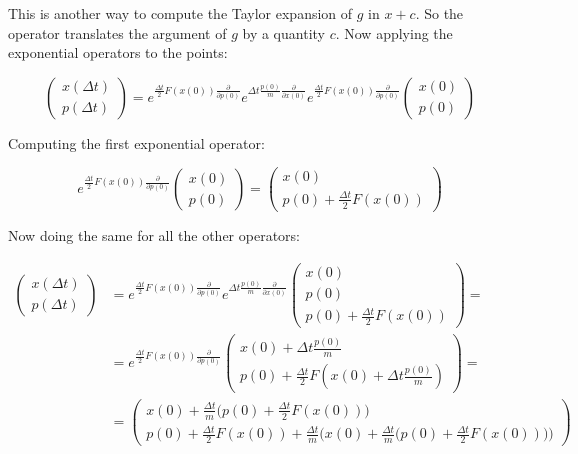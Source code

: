 	This is another way to compute the Taylor expansion of $g$ in $x+c$.
	So the operator translates the argument of $g$ by a quantity $c$.
	Now applying the exponential operators to the points:

	$$\begin{pmatrix}x(\Delta t)\\p(\Delta t)\end{pmatrix} = e^{\frac{\Delta t}{2}F(x(0))\frac{\partial}{\partial p(0)}}e^{\Delta t\frac{p(0)}{m}\frac{\partial}{\partial x(0)}}e^{\frac{\Delta t}{2}F(x(0))\frac{\partial}{\partial p(0)}}\begin{pmatrix}x(0)\\p(0)\end{pmatrix}$$

	Computing the first exponential operator:

	$$e^{\frac{\Delta t}{2}F(x(0))\frac{\partial}{\partial p(0)}}\begin{pmatrix}x(0)\\p(0)\end{pmatrix} = \begin{pmatrix}x(0)\\p(0) + \frac{\Delta t}{2}F(x(0))\end{pmatrix}$$

	Now doing the same for all the other operators:

	\begin{align*}
		\begin{pmatrix} x(\Delta t)\\ p(\Delta t)\end{pmatrix} &= e^{\frac{\Delta t}{2}F(x(0))\frac{\partial}{\partial p(0)}}e^{\Delta t\frac{p(0)}{m}\frac{\partial }{\partial x(0)}}\begin{pmatrix} x(0)\\p(0)\\p(0) + \frac{\Delta t}{2}F(x(0))\end{pmatrix} =\\
																													 & = e^{\frac{\Delta t}{2}F(x(0))\frac{\partial}{\partial p(0)}}\begin{pmatrix}x(0) + \Delta t\frac{p(0)}{m}\\p(0) + \frac{\Delta t}{2}F(x(0) + \Delta t\frac{p(0)}{m})\end{pmatrix} =\\
																													 &= \begin{pmatrix} x(0) + \frac{\Delta t}{m}\biggl(p(0) + \frac{\Delta t}{2}F(x(0))\biggr) \\ p(0) + \frac{\Delta t}{2}F(x(0)) + \frac{\Delta t}{m}\biggl(x(0) + \frac{\Delta t}{m}\biggl(p(0) + \frac{\Delta t}{2}F(x(0))\biggr)\biggr)\end{pmatrix}
	\end{align*}

